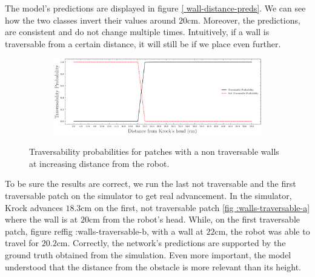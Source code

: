 \documentclass[../document.tex]{subfiles}
\begin{document}
The model's predictions are displayed in figure \ref{ wall-distance-preds}. We can see how the two classes invert their values around $20$cm. Moreover, the predictions, are consistent and do not change multiple times. Intuitively, if a wall is traversable from a certain distance, it will still be if we place even further.
\begin{figure}[htbp]
    \centering
\begin{subfigure}[b]{1\textwidth}
    \includegraphics[width=\linewidth]{../img/5/custom_patches/walls_front/predictions.png}
    \end{subfigure}
    \caption{Traversability probabilities for patches  with a non traversable walls at increasing distance from the robot.}
\label{wall-distance-preds}
\end{figure}
To be sure the results are correct, we run the last not traversable and the first traversable patch on the simulator to get real advancement. In the simulator, Krock advances $18.3$cm on the first, not traversable patch \ref{fig :walls-traversable-a} where the wall is at $20$cm from the robot's head. While, on the first traversable patch, figure ref{fig :walls-traversable-b}, with a wall at $22$cm, the robot was able to travel for $20.2$cm. Correctly, the network's predictions are supported by the ground truth obtained from the simulation. Even more important, the model understood that the distance from the obstacle is more relevant than its height.
\end{document}
